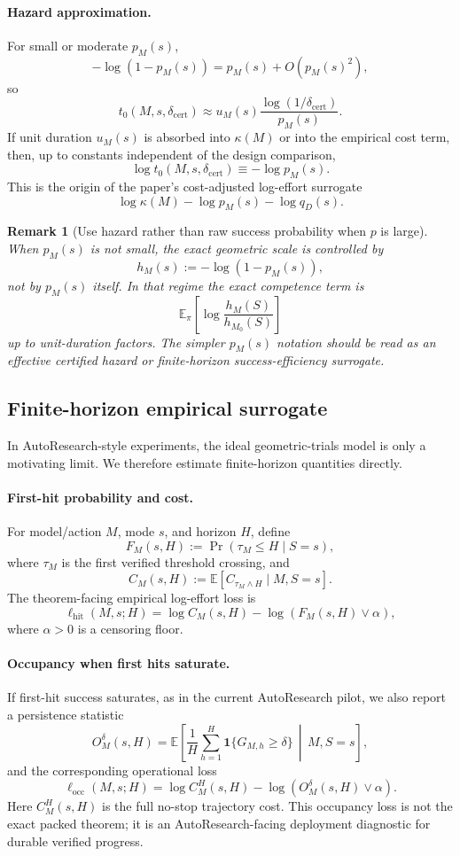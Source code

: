 \documentclass{article}
\newtheorem{remark}{Remark}
\newcommand{\E}{\mathbb{E}}
\newcommand{\one}{\mathbf{1}}
\begin{document}
\paragraph{Hazard approximation.}
For small or moderate \(p_M(s)\),
\[
    -\log(1-p_M(s))=p_M(s)+O(p_M(s)^2),
\]
so
\[
    t_0(M,s,\delta_{\mathrm{cert}})
    \approx
    u_M(s)\frac{\log(1/\delta_{\mathrm{cert}})}{p_M(s)}.
\]
If unit duration \(u_M(s)\) is absorbed into \(\kappa(M)\) or into the empirical cost term,
then, up to constants independent of the design comparison,
\[
    \log t_0(M,s,\delta_{\mathrm{cert}})
    \equiv
    -\log p_M(s).
\]
This is the origin of the paper's cost-adjusted log-effort surrogate
\[
    \log\kappa(M)-\log p_M(s)-\log q_D(s).
\]

\begin{remark}[Use hazard rather than raw success probability when \(p\) is large]
When \(p_M(s)\) is not small, the exact geometric scale is controlled by
\[
    h_M(s):=-\log(1-p_M(s)),
\]
not by \(p_M(s)\) itself.
In that regime the exact competence term is
\[
    \E_\pi
    \left[
        \log\frac{h_M(S)}{h_{M_0}(S)}
    \right]
\]
up to unit-duration factors.
The simpler \(p_M(s)\) notation should be read as an effective certified hazard or
finite-horizon success-efficiency surrogate.
\end{remark}

\subsection{Finite-horizon empirical surrogate}

In AutoResearch-style experiments, the ideal geometric-trials model is only a motivating
limit.  We therefore estimate finite-horizon quantities directly.

\paragraph{First-hit probability and cost.}
For model/action \(M\), mode \(s\), and horizon \(H\), define
\[
    F_M(s,H):=\Pr(\tau_M\le H\mid S=s),
\]
where \(\tau_M\) is the first verified threshold crossing, and
\[
    C_M(s,H):=\E[C_{\tau_M\wedge H}\mid M,S=s].
\]
The theorem-facing empirical log-effort loss is
\[
    \ell_{\mathrm{hit}}(M,s;H)
    =
    \log C_M(s,H)-\log(F_M(s,H)\vee\alpha),
\]
where \(\alpha>0\) is a censoring floor.

\paragraph{Occupancy when first hits saturate.}
If first-hit success saturates, as in the current AutoResearch pilot, we also report a
persistence statistic
\[
    O_M^\delta(s,H)
    =
    \E\left[
        \frac1H\sum_{h=1}^H
        \one\{G_{M,h}\ge\delta\}
        \,\middle|\,
        M,S=s
    \right],
\]
and the corresponding operational loss
\[
    \ell_{\mathrm{occ}}(M,s;H)
    =
    \log C_M^H(s,H)-\log(O_M^\delta(s,H)\vee\alpha).
\]
Here \(C_M^H(s,H)\) is the full no-stop trajectory cost.
This occupancy loss is not the exact packed theorem; it is an AutoResearch-facing
deployment diagnostic for durable verified progress.
\end{document}
